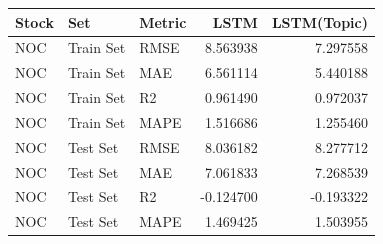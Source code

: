\begin{tabular}{lllrr}
\toprule
Stock & Set & Metric & LSTM & LSTM(Topic) \\
\midrule
NOC & Train Set & RMSE & 8.563938 & 7.297558 \\
NOC & Train Set & MAE & 6.561114 & 5.440188 \\
NOC & Train Set & R2 & 0.961490 & 0.972037 \\
NOC & Train Set & MAPE & 1.516686 & 1.255460 \\
NOC & Test Set & RMSE & 8.036182 & 8.277712 \\
NOC & Test Set & MAE & 7.061833 & 7.268539 \\
NOC & Test Set & R2 & -0.124700 & -0.193322 \\
NOC & Test Set & MAPE & 1.469425 & 1.503955 \\
\bottomrule
\end{tabular}

